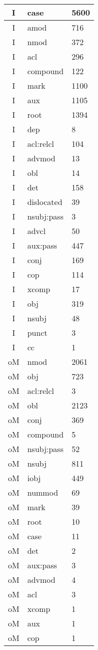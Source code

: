\documentclass[a4 paper]{article}
\begin{document}
\begin{longtable}{cp{}p{}}
I & case & 5600\\ \midrule I & amod & 716\\ \midrule I & nmod & 372\\ \midrule I & acl & 296\\ \midrule I & compound & 122\\ \midrule I & mark & 1100\\ \midrule I & aux & 1105\\ \midrule I & root & 1394\\ \midrule I & dep & 8\\ \midrule I & acl:relcl & 104\\ \midrule I & advmod & 13\\ \midrule I & obl & 14\\ \midrule I & det & 158\\ \midrule I & dislocated & 39\\ \midrule I & nsubj:pass & 3\\ \midrule I & advcl & 50\\ \midrule I & aux:pass & 447\\ \midrule I & conj & 169\\ \midrule I & cop & 114\\ \midrule I & xcomp & 17\\ \midrule I & obj & 319\\ \midrule I & nsubj & 48\\ \midrule I & punct & 3\\ \midrule I & cc & 1\\ \midrule 
oM & nmod & 2061\\ \midrule oM & obj & 723\\ \midrule oM & acl:relcl & 3\\ \midrule oM & obl & 2123\\ \midrule oM & conj & 369\\ \midrule oM & compound & 5\\ \midrule oM & nsubj:pass & 52\\ \midrule oM & nsubj & 811\\ \midrule oM & iobj & 449\\ \midrule oM & nummod & 69\\ \midrule oM & mark & 39\\ \midrule oM & root & 10\\ \midrule oM & case & 11\\ \midrule oM & det & 2\\ \midrule oM & aux:pass & 3\\ \midrule oM & advmod & 4\\ \midrule oM & acl & 3\\ \midrule oM & xcomp & 1\\ \midrule oM & aux & 1\\ \midrule oM & cop & 1\\ \midrule 

\end{longtable}
\end{document}
